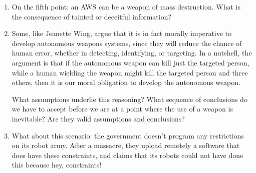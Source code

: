 \documentclass[letta4 paper]{article}
\numberwithin{equation}{section}
\newcommand{\0}{\mathbf{0}}
\begin{document}
\begin{enumerate}
		\item On the fifth point: an AWS can be a weapon of mass destruction. What is the consequence of tainted or deceitful information?
		
		\item Some, like Jeanette Wing, argue that it is in fact morally imperative to develop autonomous weapons systems, since they will reduce the chance of human error, whether in detecting, identifying, or targeting. 
		In a nutshell, the argument is that if the autonomous weapon can kill just the targeted person, while a human wielding the weapon might kill the targeted person and three others, then it is our moral obligation to develop the autonomous weapon.
		
		What assumptions underlie this reasoning? 
		What sequence of conclusions do we have to accept before we are at a point where the use of a weapon is inevitable? 
		Are they valid assumptions and conclusions?
		
		\item What about this scenario: the government doesn't program any restrictions on its robot army. After a massacre, they upload remotely a software that does have these constraints, and claims that its robots could not have done this because hey, constraints!
		
		
	\end{enumerate}
		
			
\end{document}
